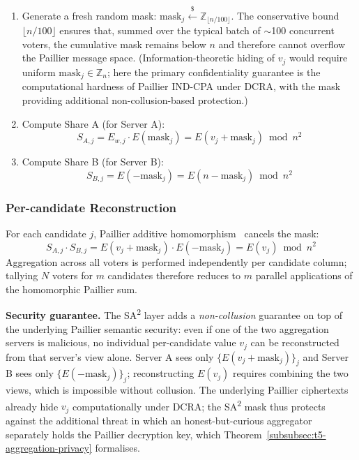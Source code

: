 \begin{enumerate}
    \item Generate a fresh random mask: $\text{mask}_j \xleftarrow{\$} \mathbb{Z}_{\lfloor n / 100 \rfloor}$. The conservative bound $\lfloor n/100 \rfloor$ ensures that, summed over the typical batch of $\sim$100 concurrent voters, the cumulative mask remains below $n$ and therefore cannot overflow the Paillier message space. (Information-theoretic hiding of $v_j$ would require uniform $\text{mask}_j \in \mathbb{Z}_n$; here the primary confidentiality guarantee is the computational hardness of Paillier IND-CPA under DCRA, with the mask providing additional non-collusion-based protection.)
    \item Compute Share A (for Server A):
    \begin{equation}
        S_{A,j} = E_{w,j} \cdot E(\text{mask}_j) = E(v_j + \text{mask}_j) \bmod n^2
        \label{eq:sa2-share-a}
    \end{equation}
    \item Compute Share B (for Server B):
    \begin{equation}
        S_{B,j} = E(-\text{mask}_j) = E(n - \text{mask}_j) \bmod n^2
        \label{eq:sa2-share-b}
    \end{equation}
\end{enumerate}

\subsubsection{Per-candidate Reconstruction}
\label{subsubsec:sa2-reconstruct}

For each candidate $j$, Paillier additive homomorphism~\cite{paillier1999} cancels the mask:
\begin{equation}
    S_{A,j} \cdot S_{B,j} = E(v_j + \text{mask}_j) \cdot E(-\text{mask}_j) = E(v_j) \bmod n^2
    \label{eq:sa2-reconstruct}
\end{equation}
Aggregation across all voters is performed independently per candidate column; tallying $N$ voters for $m$ candidates therefore reduces to $m$ parallel applications of the homomorphic Paillier sum.

\textbf{Security guarantee.} The SA\textsuperscript{2} layer adds a \emph{non-collusion} guarantee on top of the underlying Paillier semantic security: even if one of the two aggregation servers is malicious, no individual per-candidate value $v_j$ can be reconstructed from that server's view alone. Server A sees only $\{E(v_j + \text{mask}_j)\}_j$ and Server B sees only $\{E(-\text{mask}_j)\}_j$; reconstructing $E(v_j)$ requires combining the two views, which is impossible without collusion. The underlying Paillier ciphertexts already hide $v_j$ computationally under DCRA; the SA\textsuperscript{2} mask thus protects against the additional threat in which an honest-but-curious aggregator separately holds the Paillier decryption key, which Theorem~\ref{subsubsec:t5-aggregation-privacy} formalises.

